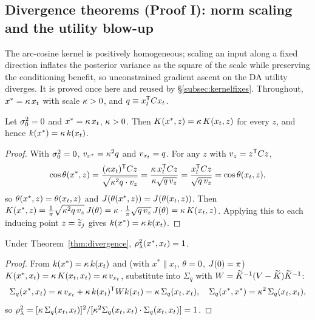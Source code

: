 \subsection{Divergence theorems (Proof I): norm scaling and the utility blow-up}
\label{subsec:divergence}

The arc-cosine kernel is positively homogeneous; scaling an input along a fixed
direction inflates the posterior variance as the square of the scale while
preserving the conditioning benefit, so unconstrained gradient ascent on the DA
utility diverges. It is proved once here and reused by \S\ref{subsec:kernelfixes}.
Throughout, $x^*=\kappa\,x_t$ with scale $\kappa>0$, and $q\equiv x_t^{\mathsf{T}}C x_t$.

\begin{theorem}[Cross-kernel proportionality, $\sigz^2=0$]\label{thm:divergence}
Let $\sigz^2=0$ and $x^*=\kappa\,x_t$, $\kappa>0$. Then $K(x^*,z)=\kappa\,K(x_t,z)$
for every $z$, and hence $k(x^*)=\kappa\,k(x_t)$.
\end{theorem}
\begin{proof}
With $\sigz^2=0$, $v_{x^*}=\kappa^2 q$ and $v_{x_t}=q$. For any $z$ with
$v_z=z^{\mathsf{T}}C z$,
\[
  \cos\theta(x^*,z)=\frac{(\kappa x_t)^{\mathsf{T}}C z}{\sqrt{\kappa^2 q\cdot v_z}}
   =\frac{\kappa\,x_t^{\mathsf{T}}C z}{\kappa\sqrt{q\,v_z}}
   =\frac{x_t^{\mathsf{T}}C z}{\sqrt{q\,v_z}}=\cos\theta(x_t,z),
\]
so $\theta(x^*,z)=\theta(x_t,z)$ and $J(\theta(x^*,z))=J(\theta(x_t,z))$. Then
$K(x^*,z)=\tfrac1\pi\sqrt{\kappa^2 q\,v_z}\,J(\theta)=\kappa\cdot\tfrac1\pi\sqrt{q\,v_z}\,J(\theta)=\kappa\,K(x_t,z)$.
Applying this to each inducing point $z=\widetilde{z}_j$ gives $k(x^*)=\kappa\,k(x_t)$.
\end{proof}

\begin{corollary}\label{cor:rho1}
Under Theorem~\ref{thm:divergence}, $\rho_{\lambda}^2(x^*,x_t)=1$.
\end{corollary}
\begin{proof}
From $k(x^*)=\kappa\,k(x_t)$ and (with $x^*\parallel x_t$, $\theta=0$,
$J(0)=\pi$) $K(x^*,x_t)=\kappa\,K(x_t,x_t)=\kappa\,v_{x_t}$, substitute
into $\Sigma_q$ with $W=\widetilde{K}^{-1}(V-\widetilde{K})\widetilde{K}^{-1}$:
\[
  \Sigma_q(x^*,x_t)=\kappa\,v_{x_t}+\kappa\,k(x_t)^{\mathsf{T}} Wk(x_t)=\kappa\,\Sigma_q(x_t,x_t),
  \quad
  \Sigma_q(x^*,x^*)=\kappa^2\,\Sigma_q(x_t,x_t),
\]
so $\rho_{\lambda}^2=[\kappa\,\Sigma_q(x_t,x_t)]^2/[\kappa^2\Sigma_q(x_t,x_t)\cdot\Sigma_q(x_t,x_t)]=1$.
\end{proof}

